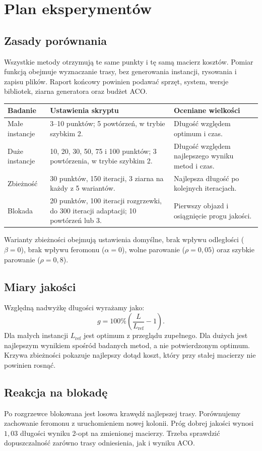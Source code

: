 \documentclass[11pt,a4paper]{article}
\newcommand{\plik}[1]{\texttt{\detokenize{#1}}}
\newcommand{\rozdzial}[1]{\clearpage\section{#1}}
\begin{document}
\rozdzial{Plan eksperymentów}
\subsection{Zasady porównania}
Wszystkie metody otrzymują te same punkty i tę samą macierz kosztów. Pomiar funkcją \plik{time.perf_counter} obejmuje wyznaczanie trasy, bez generowania instancji, rysowania i zapisu plików. Raport końcowy powinien podawać sprzęt, system, wersje bibliotek, ziarna generatora oraz budżet ACO.

\begin{tabularx}{\textwidth}{@{}p{2.5cm}Y p{4.2cm}@{}}
\toprule
\textbf{Badanie} & \textbf{Ustawienia skryptu} & \textbf{Oceniane wielkości} \\
\midrule
Małe instancje & 3--10 punktów; 5 powtórzeń, w trybie szybkim 2. & Długość względem optimum i czas. \\
Duże instancje & 10, 20, 30, 50, 75 i 100 punktów; 3 powtórzenia, w trybie szybkim 2. & Długość względem najlepszego wyniku metod i czas. \\
Zbieżność & 30 punktów, 150 iteracji, 3 ziarna na każdy z 5 wariantów. & Najlepsza długość po kolejnych iteracjach. \\
Blokada & 20 punktów, 100 iteracji rozgrzewki, do 300 iteracji adaptacji; 10 powtórzeń lub 3. & Pierwszy objazd i osiągnięcie progu jakości. \\
\bottomrule
\end{tabularx}

Warianty zbieżności obejmują ustawienia domyślne, brak wpływu odległości ($\beta=0$), brak wpływu feromonu ($\alpha=0$), wolne parowanie ($\rho=0{,}05$) oraz szybkie parowanie ($\rho=0{,}8$).

\subsection{Miary jakości}
Względną nadwyżkę długości wyrażamy jako:
\begin{equation}
g=100\%\left(\frac{L}{L_{\mathrm{ref}}}-1\right).
\end{equation}
Dla małych instancji $L_{\mathrm{ref}}$ jest optimum z przeglądu zupełnego. Dla dużych jest najlepszym wynikiem spośród badanych metod, a nie potwierdzonym optimum. Krzywa zbieżności pokazuje najlepszy dotąd koszt, który przy stałej macierzy nie powinien rosnąć.

\subsection{Reakcja na blokadę}
Po rozgrzewce blokowana jest losowa krawędź najlepszej trasy. Porównujemy zachowanie feromonu z uruchomieniem nowej kolonii. Próg dobrej jakości wynosi $1{,}03$ długości wyniku 2-opt na zmienionej macierzy. Trzeba sprawdzić dopuszczalność zarówno trasy odniesienia, jak i wyniku ACO.
\end{document}
